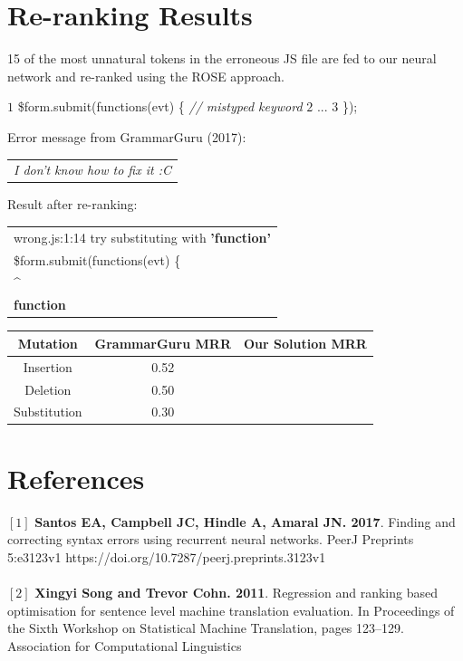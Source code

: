 \documentclass[a0,portrait]{a0poster}
\newcommand\tab[1][1cm]{\hspace*{#1}}
\newcommand{\textincon}[1]{%
{\fontfamily{zi4}\selectfont #1}}
\begin{document}
\begin{multicols}{2}
\section*{Re-ranking Results}
15 of the most unnatural tokens in the erroneous JS file are fed to our neural network and re-ranked using the ROSE approach.
\color{Black}
\begin{algorithmic}
\State $1$ \textincon{\$form.submit(functions(evt) \{} \tab \textit{\color{red} // mistyped keyword }\color{Black}
\State $2$ \tab\tab ...
\State $3$ \textincon{\});}
\end{algorithmic}
\color{NavyBlue} Error message from GrammarGuru (2017):\\\color{Black}
\begin{tabular}{|p{37cm}}
\tab \textincon{\textit{\color{red} I don't know how to fix it :C\color{Black}}}\\
\end{tabular}
\color{NavyBlue} Result after re-ranking:\\\color{Black}
\begin{tabular}{|p{37cm}}
\tab \textincon{wrong.js:1:14 try substituting with} \textbf{'function'} \\
\tab \textincon{\$form.submit(functions(evt) \{}\\
\tab\tab\tab\tab\tab\tab\tab\tab\tab\tab\tab \textincon{\^{}}\\
\tab\tab\tab\tab\tab\tab\tab\tab\tab\tab\tab \textincon{\textbf{function}}
\end{tabular}
\begin{center}
\vspace{1cm}
\begin{tabular}{ |c|c|c| }
 \hline
 \textbf{Mutation} & \textbf{GrammarGuru MRR} & \textbf{Our Solution MRR}\\
 \hline
 Insertion & 0.52 & \tab \\
 Deletion & 0.50 & \tab \\
 Substitution & 0.30 & \tab \\
 \hline
\end{tabular}
\end{center}
\color{Navy}
\section*{References}
\large
$[1]$ \textbf{Santos EA, Campbell JC, Hindle A, Amaral JN. 2017}. Finding and correcting syntax errors using recurrent neural networks. PeerJ Preprints 5:e3123v1 https://doi.org/10.7287/peerj.preprints.3123v1
\\
\\
$[2]$ \textbf{Xingyi Song and Trevor Cohn. 2011}. Regression and ranking based optimisation for sentence level machine translation evaluation. In Proceedings of the Sixth Workshop on Statistical Machine Translation, pages 123–129. Association for Computational Linguistics
\end{multicols}
\end{document}
